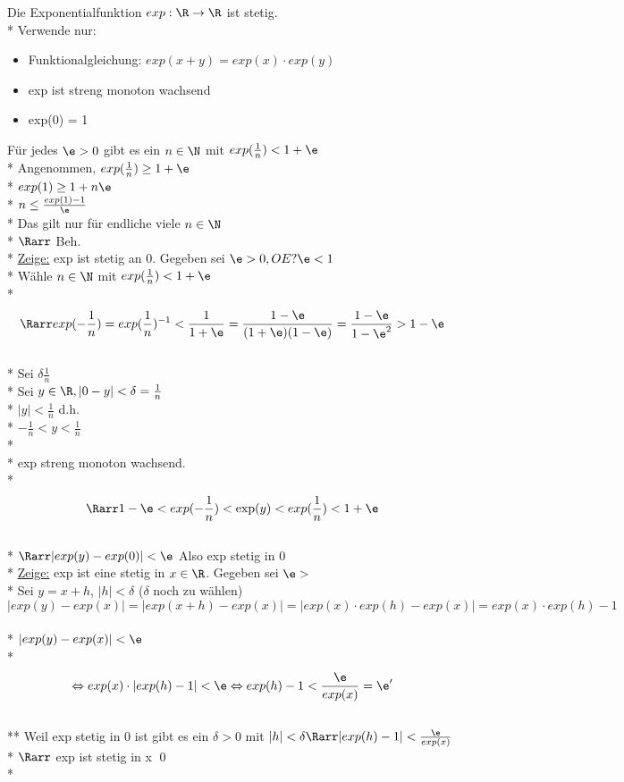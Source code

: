 Die Exponentialfunktion $exp: \R \to \R$ ist stetig.\\*
\bew
Verwende nur:
\begin{itemize}
\item{Funktionalgleichung: $exp(x + y) = exp(x) \cdot exp(y)$}
\item{exp ist streng monoton wachsend}
\item{exp(0) = 1}
\end{itemize}
Für jedes $\e > 0$ gibt es ein $n \in \N$ mit $exp(\frac{1}{n}) < 1 + \e$\\*
Angenommen, $exp(\frac{1}{n}) \geq 1 + \e$\\*
$exp(1) \geq 1 + n \e$\\*
$n \leq \frac{exp(1) - 1}{\e}$\\*
Das gilt nur für endliche viele $n \in \N$\\*
$\Rarr$ Beh.\\*
\ul{Zeige:} exp ist stetig an 0. Gegeben sei $\e > 0, OE ? \e < 1$\\*
Wähle $n \in \N$ mit $exp(\frac{1}{n}) < 1 + \e$\\*
$$\Rarr exp(-\frac{1}{n}) = exp(\frac{1}{n})^{-1} < \frac{1}{1 + \e} = \frac{1 - \e}{(1+\e)(1-\e)} = \frac{1-\e}{1 - \e^2} > 1 - \e$$\\*
Sei $\delta \frac{1}{n}$\\*
Sei $y \in \R, |0 - y| < \delta = \frac{1}{n}$\\*
$|y| < \frac{1}{n}$ d.h.\\*
$-\frac{1}{n} < y < \frac{1}{n}$\\* \\*
exp streng monoton wachsend.\\*
$$\Rarr 1 - \e < exp(-\frac{1}{n}) < \exp(y) < exp(\frac{1}{n}) < 1 + \e$$\\*
$\Rarr |exp(y) - exp(0)| < \e$ Also exp stetig in 0\\*
\ul{Zeige:} exp ist eine stetig in $x \in \R$. Gegeben sei $\e > $\\*
Sei $y = x + h$, $|h| < \delta$ ($\delta$ noch zu wählen)
$$|exp(y) - exp(x)| = |exp(x + h) - exp(x)| = |exp(x) \cdot exp(h) - exp(x)| = exp(x) \cdot exp(h) -1$$\\*
$|exp(y) -exp(x) | < \e$\\*
$$\Leftrightarrow exp(x) \cdot |exp(h) - 1| < \e \Leftrightarrow exp(h) - 1 < \frac{\e}{exp(x)} = \e '$$\\**
Weil exp stetig in 0 ist gibt es ein $\delta > 0$ mit $|h| < \delta \Rarr |exp(h) -1| < \frac{\e}{exp(x)}$\\*
$\Rarr$ exp ist stetig in x \qed\\*

